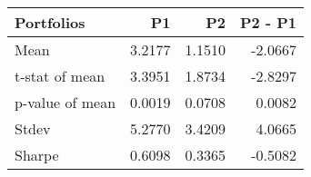 \begin{tabular}{lrrr}
\toprule
Portfolios & P1 & P2 & P2 - P1 \\
\midrule
Mean & 3.2177 & 1.1510 & -2.0667 \\
t-stat of mean & 3.3951 & 1.8734 & -2.8297 \\
p-value of mean & 0.0019 & 0.0708 & 0.0082 \\
Stdev & 5.2770 & 3.4209 & 4.0665 \\
Sharpe & 0.6098 & 0.3365 & -0.5082 \\
\bottomrule
\end{tabular}
